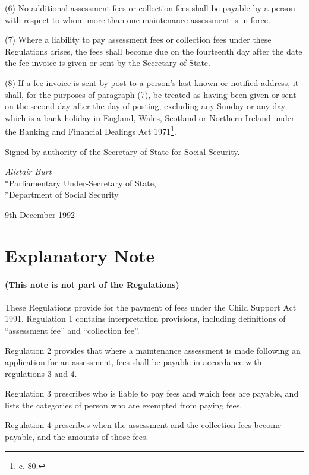 \documentclass[12pt,a4paper]{article}
\begin{document}
(6) No additional assessment fees or collection fees shall be payable by a person with respect to whom more than one maintenance assessment is in force.

(7) Where a liability to pay assessment fees or collection fees under these Regulations arises, the fees shall become due on the fourteenth day after the date the fee invoice is given or sent by the Secretary of State.

(8) If a fee invoice is sent by post to a person’s last known or notified address, it shall, for the purposes of paragraph (7), be treated as having been given or sent on the second day after the day of posting, excluding any Sunday or any day which is a bank holiday in England, Wales, Scotland or Northern Ireland under the Banking and Financial Dealings Act 1971\footnote{ c. 80.}.


\bigskip

Signed by authority of the Secretary of State for Social Security.

{\raggedleft
\emph{Alistair Burt}\\*Parliamentary Under-Secretary of State,\\*Department of Social Security

}

9th December 1992

\part{Explanatory Note}

\renewcommand\parthead{--- Explanatory Note}

\subsection*{(This note is not part of the Regulations)}

 These Regulations provide for the payment of fees under the Child Support Act 1991. Regulation 1 contains interpretation provisions, including definitions of “assessment fee” and “collection fee”.

  Regulation 2 provides that where a maintenance assessment is made following an application for an assessment, fees shall be payable in accordance with regulations 3 and 4.

  Regulation 3 prescribes who is liable to pay fees and which fees are payable, and lists the categories of person who are exempted from paying fees.

  Regulation 4 prescribes when the assessment and the collection fees become payable, and the amounts of those fees.
\end{document}
